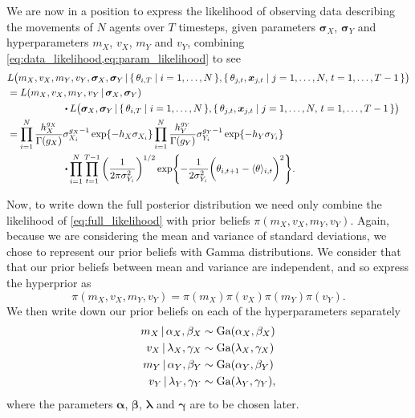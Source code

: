 We are now in a position to express the likelihood of observing data describing the movements of $N$ 
agents over $T$ timesteps, given parameters $\bm{\sigma}_X$, $\bm{\sigma}_Y$ and hyperparameters 
$m_X$, $v_X$, $m_Y$ and $v_Y$, combining \cref{eq:data_likelihood,eq:param_likelihood} to see
\begin{align}
\label{eq:full_likelihood}
\begin{split}
& 	L\big(m_X, v_X, m_Y, v_Y, \bm{\sigma}_X, \bm{\sigma}_Y  \given \{\,\theta_{i, T} \mid 
i=1,\ldots,N\,\},  \{\,\theta_{j, t}, \bm{x}_{j, t} \mid j= 1,\ldots, N, \, t=1,  \ldots,T-1\,\}\big) 
\\
	& = 	L(m_X, v_X, m_Y, v_Y \given \bm{\sigma}_X, \bm{\sigma}_Y)\\
	& \qquad\qquad\qquad \!\! \bigcdot L\big(\bm{\sigma}_X, \bm{\sigma}_Y  \given \{\,\theta_{i, T} \mid 
i=1,\ldots,N\,\},  \{\,\theta_{j, t}, \bm{x}_{j, t} \mid j= 1,\ldots, N, \, t=1,  
\ldots,T-1\,\}\big)\\
	& = \prod_{i=1}^N \frac{h_X^{g_X}}{\Gamma(g_X)} \sigma_{X_i}^{g_X - 1} \exp{-h_X \sigma_{X_i}} 
\prod_{i=1}^N  \frac{h_Y^{g_Y}}{\Gamma(g_Y)} \sigma_{Y_i}^{g_Y - 1} \exp{-h_Y \sigma_{Y_i}}\\
	& \qquad\qquad\qquad \!\! \bigcdot \prod_{i=1}^N \prod_{t=1}^{T-1} \bigg( 
\frac{1}{2\pi\sigma_{Y_i}^2} \bigg)^{1/2} \exp{-\frac{1}{2\sigma_{Y_i}^2} \bigg(\theta_{i, t+1} - 
\langle \theta \rangle_{i, t}\bigg)^2 }.
\end{split}
\end{align}

Now, to write down the full posterior distribution we need only combine the likelihood of 
\cref{eq:full_likelihood} with prior beliefs $\pi(m_X, v_X, m_Y, v_Y)$. Again, because we are 
considering the mean and variance of standard deviations, we chose to represent our prior beliefs 
with Gamma distributions. We consider that that our prior beliefs between mean and variance are 
independent, and so express the hyperprior as
\begin{equation*}
	\pi(m_X, v_X, m_Y, v_Y) = \pi(m_X) \pi(v_X) \pi(m_Y) \pi(v_Y).
\end{equation*}
We then write down our prior beliefs on each of the hyperparameters separately
\begin{align*}
	m_X \,|\, \alpha_X, \beta_X & \sim \textrm{Ga}(\alpha_X, \beta_X) \\
	v_X \,|\, \lambda_X, \gamma_X & \sim  \textrm{Ga}(\lambda_X, \gamma_X) \\
	m_Y \,|\, \alpha_Y, \beta_Y & \sim \textrm{Ga}(\alpha_Y, \beta_Y) \\
	v_Y \,|\, \lambda_Y, \gamma_Y & \sim  \textrm{Ga}(\lambda_Y, \gamma_Y),
\end{align*}
where the parameters $\bm{\alpha}$, $\bm{\beta}$, $\bm{\lambda}$ and $\bm{\gamma}$ are to be chosen 
later.


